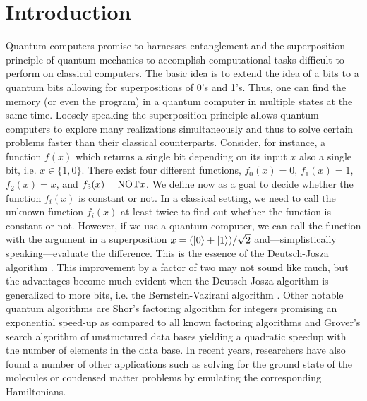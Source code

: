 \documentclass{../lab}
\begin{document}
\section{Introduction}
\label{sec:Introduction}
Quantum computers promise to harnesses entanglement and the superposition principle of quantum mechanics to accomplish computational tasks difficult to perform on classical computers. The basic idea is to extend the idea of a bits to a quantum bits allowing for superpositions of 0's and 1's. Thus, one can find the memory (or even the program) in a quantum computer in multiple states at the same time. Loosely speaking the superposition principle allows quantum computers to explore many realizations simultaneously and thus to solve certain problems faster than their classical counterparts. Consider, for instance, a function $f(x)$ which returns a single bit depending on its input $x$ also a single bit, i.e. $x\in\{1,0\}$. There exist four different functions, $f_0(x)=0$, $f_1(x)=1$, $f_2(x)=x$, and $f_3(x)={\rm NOT} x$. We define now as a goal to decide whether the function $f_i(x)$ is constant or not. In a classical setting, we need to call the unknown function $f_i(x)$ at least twice to find out whether the function is constant or not. However, if we use a quantum computer, we can call the function with the argument in a superposition $x=(\ket{0}+\ket{1})/\sqrt{2}$ and---simplistically speaking---evaluate the difference. This is the essence of the Deutsch-Josza algorithm \cite{}. This improvement by a factor of two may not sound like much, but the advantages become much evident when the Deutsch-Josza algorithm is generalized to more bits, i.e. the Bernstein-Vazirani algorithm \cite{}. 
Other notable quantum algorithms are Shor's factoring algorithm for integers \cite{} promising an exponential speed-up as compared to all known factoring algorithms and Grover's search algorithm of unstructured data bases
yielding a quadratic speedup with the number of elements in the data base\cite{}. In recent years, researchers have also found a number of other applications such as solving for the ground state of the molecules or condensed matter problems by emulating the corresponding Hamiltonians. 
\end{document}
